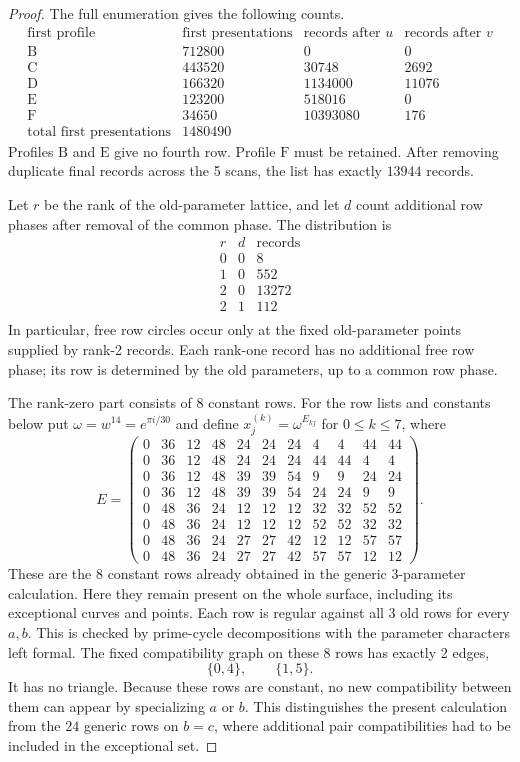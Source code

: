 \documentclass[11pt,a4paper]{article}
\theoremstyle{plain}
\theoremstyle{definition}
\theoremstyle{plain}
\begin{document}
\begin{proof}
The full enumeration gives the following counts.
\[
\begin{array}{c|r|r|r}
\text{first profile}&\text{first presentations}&\text{records after }u&\text{records after }v\\\hline
\mathrm{B}&712800&0&0\\
\mathrm{C}&443520&30748&2692\\
\mathrm{D}&166320&1134000&11076\\
\mathrm{E}&123200&518016&0\\
\mathrm{F}&34650&10393080&176\\
\hline
\text{total first presentations}&1480490&&
\end{array}
\]
Profiles $\mathrm{B}$ and $\mathrm{E}$ give no fourth row. Profile $\mathrm{F}$ must be retained. After removing duplicate final records across the 5 scans, the list has exactly $13944$ records.

Let $r$ be the rank of the old-parameter lattice, and let $d$ count additional row phases after removal of the common phase. The distribution is
\[
\begin{array}{c|c|r}
r&d&\text{records}\\\hline
0&0&8\\
1&0&552\\
2&0&13272\\
2&1&112\\
\end{array}
\]
In particular, free row circles occur only at the fixed old-parameter points supplied by rank-2 records. Each rank-one record has no additional free row phase; its row is determined by the old parameters, up to a common row phase.

\medskip
The rank-zero part consists of 8 constant rows. For the row lists and constants below put $\omega=w^{14}=e^{\pi i/30}$ and define $x^{(k)}_j=\omega^{E_{kj}}$ for $0\leq k\leq7$, where
\[
E=\begin{pmatrix}
0&36&12&48&24&24&24&4&4&44&44\\
0&36&12&48&24&24&24&44&44&4&4\\
0&36&12&48&39&39&54&9&9&24&24\\
0&36&12&48&39&39&54&24&24&9&9\\
0&48&36&24&12&12&12&32&32&52&52\\
0&48&36&24&12&12&12&52&52&32&32\\
0&48&36&24&27&27&42&12&12&57&57\\
0&48&36&24&27&27&42&57&57&12&12
\end{pmatrix}.
\]
These are the 8 constant rows already obtained in the generic 3-parameter calculation. Here they remain present on the whole surface, including its exceptional curves and points.
Each row is regular against all 3 old rows for every $a,b$. This is checked by prime-cycle decompositions with the parameter characters left formal. The fixed compatibility graph on these 8 rows has exactly 2 edges,
\[
\{0,4\},\qquad\{1,5\}.
\]
It has no triangle. Because these rows are constant, no new compatibility between them can appear by specializing $a$ or $b$. This distinguishes the present calculation from the $24$ generic rows on $b=c$, where additional pair compatibilities had to be included in the exceptional set.


\end{proof}
\end{document}
